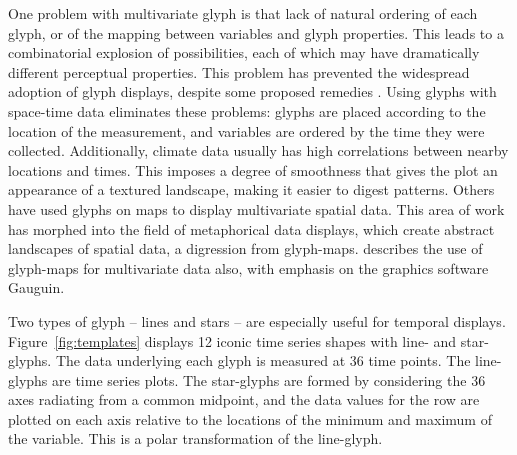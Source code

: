 \documentclass[oneside]{article}
\begin{document}

One problem with multivariate glyph is that lack of natural ordering of each glyph, or of the mapping between variables and glyph properties. This leads to a combinatorial explosion of possibilities, each of which may have dramatically different perceptual properties. This problem has prevented the widespread adoption of glyph displays, despite some proposed remedies \citep{kleiner:1981,hurley:2010}. Using glyphs with space-time data eliminates these problems: glyphs are placed according to the location of the measurement, and variables are ordered by the time they were collected. Additionally, climate data usually has high correlations between nearby locations and times. This imposes a degree of smoothness that gives the plot an appearance of a textured  landscape, making it easier to digest patterns. Others \citet{pickett:1988} have used glyphs on maps to display multivariate spatial data. This area of work has morphed into the field of metaphorical data displays, which create abstract landscapes of spatial data, a digression from glyph-maps. \citet{gribov:2006} describes the use of glyph-maps for multivariate data also, with emphasis on the graphics software Gauguin.

Two types of glyph -- lines and stars -- are especially useful for temporal displays. Figure~\ref{fig:templates} displays 12 iconic time series shapes with line- and star-glyphs. The data underlying each glyph is measured at 36 time points. The line-glyphs are   time series plots. The star-glyphs are formed by considering the 36 axes radiating from a common midpoint, and the data values for the row are plotted on each axis relative to the locations of the minimum and maximum of the variable. This is a polar transformation of the line-glyph.
\end{document}
